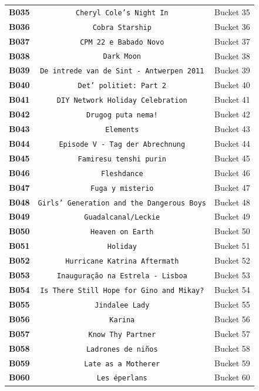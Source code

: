 \documentclass[11pt,a4paper]{article}
\begin{document}
{{\begin{xltabular}{\textwidth}{l | C | C}
\textbf{B035} & \texttt{Cheryl Cole's Night In} & Bucket 35 \\
\textbf{B036} & \texttt{Cobra Starship} & Bucket 36 \\
\textbf{B037} & \texttt{CPM 22 e Babado Novo} & Bucket 37 \\
\textbf{B038} & \texttt{Dark Moon} & Bucket 38 \\
\textbf{B039} & \texttt{De intrede van de Sint - Antwerpen 2011} & Bucket 39 \\
\textbf{B040} & \texttt{Det' politiet: Part 2} & Bucket 40 \\
\textbf{B041} & \texttt{DIY Network Holiday Celebration} & Bucket 41 \\
\textbf{B042} & \texttt{Drugog puta nema!} & Bucket 42 \\
\textbf{B043} & \texttt{Elements} & Bucket 43 \\
\textbf{B044} & \texttt{Episode V - Tag der Abrechnung} & Bucket 44 \\
\textbf{B045} & \texttt{Famiresu tenshi purin} & Bucket 45 \\
\textbf{B046} & \texttt{Fleshdance} & Bucket 46 \\
\textbf{B047} & \texttt{Fuga y misterio} & Bucket 47 \\
\textbf{B048} & \texttt{Girls' Generation and the Dangerous Boys} & Bucket 48 \\
\textbf{B049} & \texttt{Guadalcanal/Leckie} & Bucket 49 \\
\textbf{B050} & \texttt{Heaven on Earth} & Bucket 50 \\
\textbf{B051} & \texttt{Holiday} & Bucket 51 \\
\textbf{B052} & \texttt{Hurricane Katrina Aftermath} & Bucket 52 \\
\textbf{B053} & \texttt{Inauguração na Estrela - Lisboa} & Bucket 53 \\
\textbf{B054} & \texttt{Is There Still Hope for Gino and Mikay?} & Bucket 54 \\
\textbf{B055} & \texttt{Jindalee Lady} & Bucket 55 \\
\textbf{B056} & \texttt{Karina} & Bucket 56 \\
\textbf{B057} & \texttt{Know Thy Partner} & Bucket 57 \\
\textbf{B058} & \texttt{Ladrones de niños} & Bucket 58 \\
\textbf{B059} & \texttt{Late as a Mother\textbf{}er} & Bucket 59 \\
\textbf{B060} & \texttt{Les éperlans} & Bucket 60 \\

\end{xltabular}}}
\end{document}
